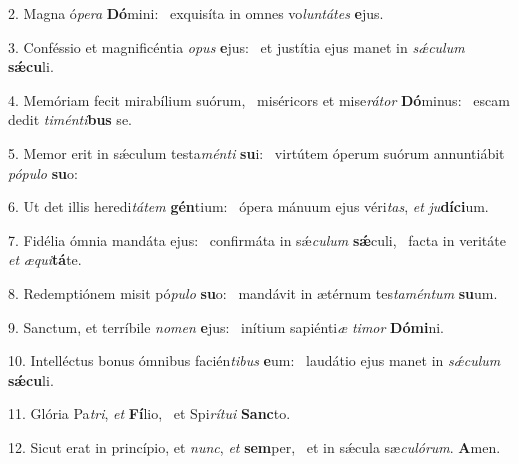 2. Magna ó\textit{pe}\textit{ra} \textbf{Dó}mini: \ast\  exquisíta in omnes vo\textit{lun}\textit{tá}\textit{tes} \textbf{e}jus.\

3. Conféssio et magnificéntia \textit{o}\textit{pus} \textbf{e}jus: \ast\  et justítia ejus manet in \textit{sǽ}\textit{cu}\textit{lum} \textbf{sǽ}\textbf{cu}li.\

4. Memóriam fecit mirabílium suórum, \dag\  miséricors et mise\textit{rá}\textit{tor} \textbf{Dó}minus: \ast\  escam dedit \textit{ti}\textit{mén}\textit{ti}\textbf{bus} se.\

5. Memor erit in sǽculum testa\textit{mén}\textit{ti} \textbf{su}i: \ast\  virtútem óperum suórum annuntiábit \textit{pó}\textit{pu}\textit{lo} \textbf{su}o:\

6. Ut det illis heredi\textit{tá}\textit{tem} \textbf{gén}tium: \ast\  ópera mánuum ejus véri\textit{tas}, \textit{et} \textit{ju}\textbf{dí}\textbf{ci}um.\

7. Fidélia ómnia mandáta ejus: \dag\  confirmáta in sǽ\textit{cu}\textit{lum} \textbf{sǽ}culi, \ast\  facta in veritáte \textit{et} \textit{æ}\textit{qui}\textbf{tá}te.\

8. Redemptiónem misit pó\textit{pu}\textit{lo} \textbf{su}o: \ast\  mandávit in ætérnum tes\textit{ta}\textit{mén}\textit{tum} \textbf{su}um.\

9. Sanctum, et terríbile \textit{no}\textit{men} \textbf{e}jus: \ast\  inítium sapiénti\textit{æ} \textit{ti}\textit{mor} \textbf{Dó}\textbf{mi}ni.\

10. Intelléctus bonus ómnibus facién\textit{ti}\textit{bus} \textbf{e}um: \ast\  laudátio ejus manet in \textit{sǽ}\textit{cu}\textit{lum} \textbf{sǽ}\textbf{cu}li.\

11. Glória Pa\textit{tri}, \textit{et} \textbf{Fí}lio, \ast\  et Spi\textit{rí}\textit{tu}\textit{i} \textbf{Sanc}to.\

12. Sicut erat in princípio, et \textit{nunc}, \textit{et} \textbf{sem}per, \ast\  et in sǽcula sæ\textit{cu}\textit{ló}\textit{rum}. \textbf{A}men.\

